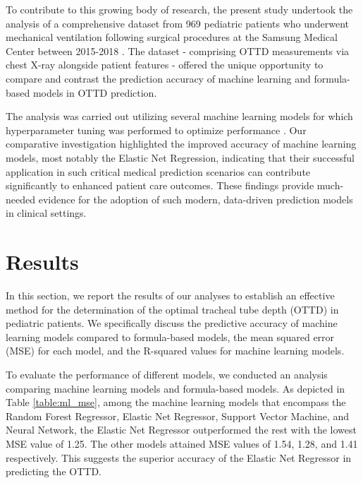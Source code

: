\documentclass[11pt]{article}
\begin{document}
To contribute to this growing body of research, the present study undertook the analysis of a comprehensive dataset from 969 pediatric patients who underwent mechanical ventilation following surgical procedures at the Samsung Medical Center between 2015-2018 \cite{Ingelse2017EarlyFO, Newth2017VariabilityIU}. The dataset - comprising OTTD measurements via chest X-ray alongside patient features - offered the unique opportunity to compare and contrast the prediction accuracy of machine learning and formula-based models in OTTD prediction.

The analysis was carried out utilizing several machine learning models for which hyperparameter tuning was performed to optimize performance \cite{Dunn2020BenchmarkingMP}. Our comparative investigation highlighted the improved accuracy of machine learning models, most notably the Elastic Net Regression, indicating that their successful application in such critical medical prediction scenarios can contribute significantly to enhanced patient care outcomes. These findings provide much-needed evidence for the adoption of such modern, data-driven prediction models in clinical settings.

\section*{Results}

In this section, we report the results of our analyses to establish an effective method for the determination of the optimal tracheal tube depth (OTTD) in pediatric patients. We specifically discuss the predictive accuracy of machine learning models compared to formula-based models, the mean squared error (MSE) for each model, and the R-squared values for machine learning models.

To evaluate the performance of different models, we conducted an analysis comparing machine learning models and formula-based models. As depicted in Table {}\ref{table:ml_mse}, among the machine learning models that encompass the Random Forest Regressor, Elastic Net Regressor, Support Vector Machine, and Neural Network, the Elastic Net Regressor outperformed the rest with the lowest MSE value of 1.25. The other models attained MSE values of 1.54, 1.28, and 1.41 respectively. This suggests the superior accuracy of the Elastic Net Regressor in predicting the OTTD.
\end{document}
